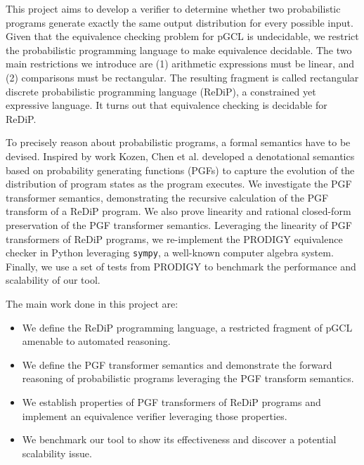 \documentclass[a4paper]{article}
\begin{document}
This project aims to develop a verifier to determine whether two probabilistic programs generate exactly the same output distribution for every possible input.
Given that the equivalence checking problem for pGCL is undecidable, we restrict the probabilistic programming language to make equivalence decidable.
The two main restrictions we introduce are (1) arithmetic expressions must be linear, and (2) comparisons must be rectangular.
The resulting fragment is called rectangular discrete probabilistic programming language (ReDiP), a constrained yet expressive language.
It turns out that equivalence checking is decidable for ReDiP.\par
To precisely reason about probabilistic programs, a formal semantics have to be devised.
Inspired by work Kozen\cite{kozen1979semantics}, Chen et al.\cite{cav-pgf} developed a denotational semantics based on probability generating functions (PGFs) to capture the evolution of the distribution of program states as the program executes.
We investigate the PGF transformer semantics, demonstrating the recursive calculation of the PGF transform of a ReDiP program.
We also prove linearity and rational closed-form preservation of the PGF transformer semantics. Leveraging the linearity of PGF transformers of ReDiP programs, we re-implement the PRODIGY equivalence checker in Python leveraging \texttt{sympy}\cite{sympy}, a well-known computer algebra system.
Finally, we use a set of tests from PRODIGY\cite{cav-extended} to benchmark the performance and scalability of our tool.\par

The main work done in this project are:

\begin{itemize}
	\item We define the ReDiP programming language, a restricted fragment of pGCL amenable to automated reasoning.
	\item We define the PGF transformer semantics and demonstrate the forward reasoning of probabilistic programs leveraging the PGF transform semantics.
	\item We establish properties of PGF transformers of ReDiP programs and implement an equivalence verifier leveraging those properties.
	\item We benchmark our tool to show its effectiveness and discover a potential scalability issue.
\end{itemize}
\end{document}
